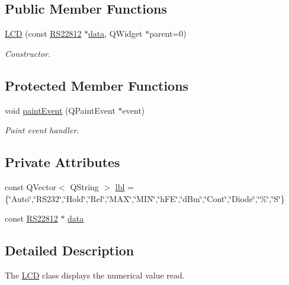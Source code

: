 \subsection*{Public Member Functions}
\begin{DoxyCompactItemize}
\item 
\hyperlink{class_l_c_d_a525b305d4aaf0d45cfd04b9b16096482}{L\-C\-D} (const \hyperlink{class_r_s22812}{R\-S22812} $\ast$\hyperlink{class_l_c_d_a04c1fe4d60f692978d1d428521e2d2a2}{data}, Q\-Widget $\ast$parent=0)
\begin{DoxyCompactList}\small\item\em Constructor. \end{DoxyCompactList}\end{DoxyCompactItemize}
\subsection*{Protected Member Functions}
\begin{DoxyCompactItemize}
\item 
void \hyperlink{class_l_c_d_a259fac152add9afdeb4543af4998d14b}{paint\-Event} (Q\-Paint\-Event $\ast$event)
\begin{DoxyCompactList}\small\item\em Paint event handler. \end{DoxyCompactList}\end{DoxyCompactItemize}
\subsection*{Private Attributes}
\begin{DoxyCompactItemize}
\item 
const Q\-Vector$<$ Q\-String $>$ \hyperlink{class_l_c_d_a80e55f48f0e7c7b791fe1602640f708a}{lbl} =\{\char`\"{}Auto\char`\"{},\char`\"{}R\-S232\char`\"{},\char`\"{}Hold\char`\"{},\char`\"{}Rel\char`\"{},\char`\"{}M\-A\-X\char`\"{},\char`\"{}M\-I\-N\char`\"{},\char`\"{}h\-F\-E\char`\"{},\char`\"{}d\-Bm\char`\"{},\char`\"{}Cont\char`\"{},\char`\"{}Diode\char`\"{},\char`\"{}\%\char`\"{},\char`\"{}S\char`\"{}\}
\item 
const \hyperlink{class_r_s22812}{R\-S22812} $\ast$ \hyperlink{class_l_c_d_a04c1fe4d60f692978d1d428521e2d2a2}{data}
\end{DoxyCompactItemize}


\subsection{Detailed Description}
The \hyperlink{class_l_c_d}{L\-C\-D} class displays the numerical value read. 

